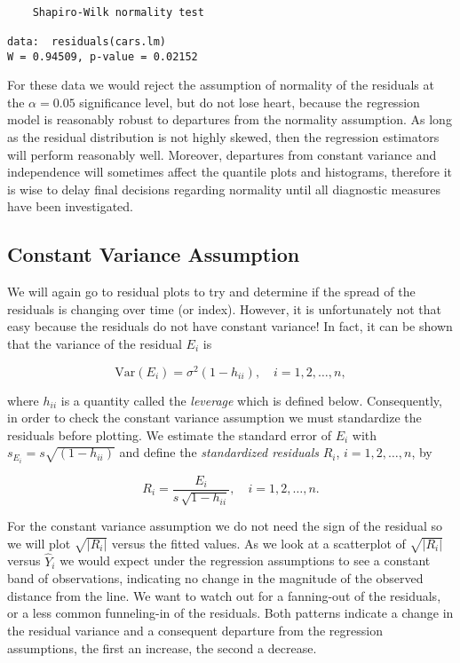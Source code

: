 \documentclass[]{book}
\numberwithin{equation}{chapter}
\numberwithin{figure}{chapter}
\theoremstyle{plain}
\theoremstyle{definition}
\theoremstyle{remark}
\theoremstyle{definition}
\theoremstyle{definition}
\theoremstyle{remark}
\begin{document}
\begin{verbatim}

    Shapiro-Wilk normality test

data:  residuals(cars.lm)
W = 0.94509, p-value = 0.02152
\end{verbatim}

For these data we would reject the assumption of normality of the
residuals at the \(\alpha=0.05\) significance level, but do not lose
heart, because the regression model is reasonably robust to departures
from the normality assumption. As long as the residual distribution is
not highly skewed, then the regression estimators will perform
reasonably well. Moreover, departures from constant variance and
independence will sometimes affect the quantile plots and histograms,
therefore it is wise to delay final decisions regarding normality until
all diagnostic measures have been investigated.

\subsection{Constant Variance
Assumption}\label{sub-constant-variance-assumption}

We will again go to residual plots to try and determine if the spread of
the residuals is changing over time (or index). However, it is
unfortunately not that easy because the residuals do not have constant
variance! In fact, it can be shown that the variance of the residual
\(E_{i}\) is

\begin{equation}
\mbox{Var$(E_{i})$}=\sigma^{2}(1-h_{ii}),\quad i=1,2,\ldots,n,
\end{equation}

where \(h_{ii}\) is a quantity called the \emph{leverage} which is
defined below. Consequently, in order to check the constant variance
assumption we must standardize the residuals before plotting. We
estimate the standard error of \(E_{i}\) with
\(s_{E_{i}}=s\sqrt{(1-h_{ii})}\) and define the \emph{standardized
residuals} \(R_{i}\), \(i=1,2,\ldots,n\), by

\begin{equation} 
R_{i}=\frac{E_{i}}{s\,\sqrt{1-h_{ii}}},\quad i=1,2,\ldots,n.
\end{equation}

For the constant variance assumption we do not need the sign of the
residual so we will plot \(\sqrt{|R_{i}|}\) versus the fitted values. As
we look at a scatterplot of \(\sqrt{|R_{i}|}\) versus \(\hat{Y}_{i}\) we
would expect under the regression assumptions to see a constant band of
observations, indicating no change in the magnitude of the observed
distance from the line. We want to watch out for a fanning-out of the
residuals, or a less common funneling-in of the residuals. Both patterns
indicate a change in the residual variance and a consequent departure
from the regression assumptions, the first an increase, the second a
decrease.
\end{document}
